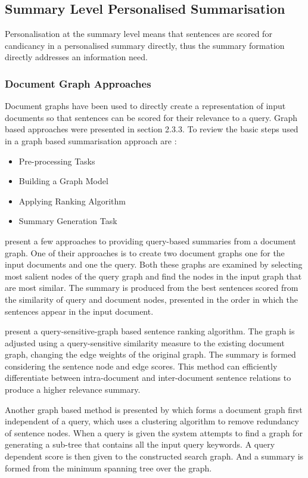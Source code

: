 \subsection{Summary Level Personalised Summarisation}
\label{subsec:2.4.1}
Personalisation at the summary level means that sentences are scored for candicancy in a personalised summary directly, thus the summary formation directly addresses an information need. 

\subsubsection{Document Graph Approaches}
Document graphs have been used to directly create a representation of input documents so that sentences can be scored for their relevance to a query. Graph based approaches were presented in section 2.3.3. To review the basic steps used in a graph based summarisation approach are \citep{rahman2015survey}:

\begin{itemize}
      \itemsep0em 
      \item Pre-processing Tasks
      \item Building a Graph Model
      \item Applying Ranking Algorithm
      \item Summary Generation Task
\end{itemize}

\citet{mohamed2006improving} present a few approaches to providing query-based summaries from a document graph. One of their approaches is to create two document graphs one for the input documents and one the query. Both these graphs are examined by selecting most salient nodes of the query graph and find the nodes in the input graph that are most similar. The summary is produced from the best sentences scored from the similarity of query and document nodes, presented in the order in which the sentences appear in the input document.

\citet{wei2008query} present a query-sensitive-graph based sentence ranking algorithm. The graph is adjusted using a query-sensitive similarity measure to the existing document graph, changing the edge weights of the original graph. The summary is formed considering the sentence node and edge scores. This method can efficiently differentiate between intra-document and inter-document sentence relations to produce a higher relevance summary. 

Another graph based method is presented by \citet{pandit2013query} which forms a document graph first independent of a query, which uses a clustering algorithm to remove redundancy of sentence nodes. When a query is given the system attempts to find a graph for generating a sub-tree that contains all the input query keywords. A query dependent score is then given to the constructed search graph. And a summary is formed from the minimum spanning tree over the graph.

